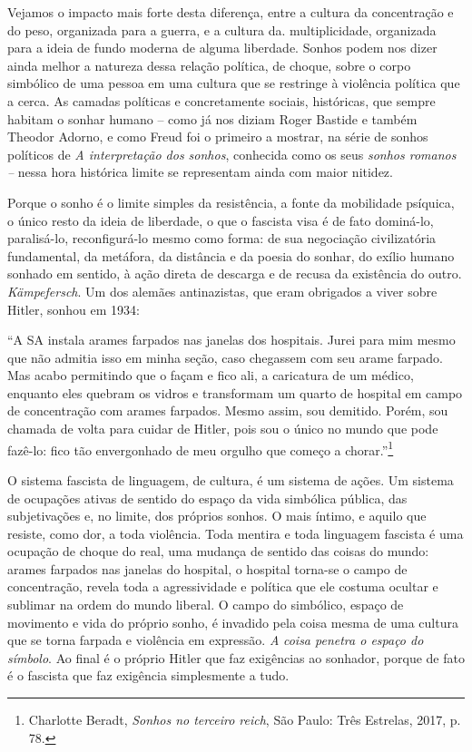 Vejamos o impacto mais forte desta diferença, entre a cultura da
concentração e do peso, organizada para a guerra, e a cultura da.
multiplicidade, organizada para a ideia de fundo moderna de alguma
liberdade. Sonhos podem nos dizer ainda melhor a natureza dessa relação
política, de choque, sobre o corpo simbólico de uma pessoa em uma
cultura que se restringe à violência política que a cerca. As camadas
políticas e concretamente sociais, históricas, que sempre habitam o
sonhar humano -- como já nos diziam Roger Bastide e também Theodor
Adorno, e como Freud foi o primeiro a mostrar, na série de sonhos
políticos de \emph{A interpretação dos sonhos}, conhecida como os seus
\emph{sonhos romanos --} nessa hora histórica limite se representam
ainda com maior nitidez.

Porque o sonho é o limite simples da resistência, a fonte da mobilidade
psíquica, o único resto da ideia de liberdade, o que o fascista visa é
de fato dominá-lo, paralisá-lo, reconfigurá-lo mesmo como forma: de sua
negociação civilizatória fundamental, da metáfora, da distância e da
poesia do sonhar, do exílio humano sonhado em sentido, à ação direta de
descarga e de recusa da existência do outro. \emph{Kämpefersch}. Um dos
alemães antinazistas, que eram obrigados a viver sobre Hitler, sonhou em
1934:

``A SA instala arames farpados nas janelas dos hospitais. Jurei para mim
mesmo que não admitia isso em minha seção, caso chegassem com seu arame
farpado. Mas acabo permitindo que o façam e fico ali, a caricatura de um
médico, enquanto eles quebram os vidros e transformam um quarto de
hospital em campo de concentração com arames farpados. Mesmo assim, sou
demitido. Porém, sou chamada de volta para cuidar de Hitler, pois sou o
único no mundo que pode fazê-lo: fico tão envergonhado de meu orgulho
que começo a chorar.''\footnote{Charlotte Beradt, \emph{Sonhos no
  terceiro reich}, São Paulo: Três Estrelas, 2017, p. 78.}

O sistema fascista de linguagem, de cultura, é um sistema de ações. Um
sistema de ocupações ativas de sentido do espaço da vida simbólica
pública, das subjetivações e, no limite, dos próprios sonhos. O mais
íntimo, e aquilo que resiste, como dor, a toda violência. Toda mentira e
toda linguagem fascista é uma ocupação de choque do real, uma mudança de
sentido das coisas do mundo: arames farpados nas janelas do hospital, o
hospital torna-se o campo de concentração, revela toda a agressividade e
política que ele costuma ocultar e sublimar na ordem do mundo liberal. O
campo do simbólico, espaço de movimento e vida do próprio sonho, é
invadido pela coisa mesma de uma cultura que se torna farpada e
violência em expressão. \emph{A} \emph{coisa penetra o espaço do
símbolo}. Ao final é o próprio Hitler que faz exigências ao sonhador,
porque de fato é o fascista que faz exigência simplesmente a tudo.

